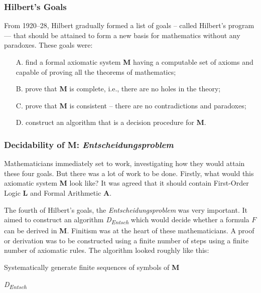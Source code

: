 \documentclass[a4paper, 12pt]{article}
\theoremstyle{definition}
\begin{document}
    \subsubsection*{Hilbert's Goals}
    \vspace{-0.75 em}
    From 1920--28, Hilbert gradually formed a list of goals -- called Hilbert's program --- that should be attained to form a new basis 
    for mathematics without any paradoxes. These goals were:
    \vspace{-0.75 em}
    \begin{enumerate}
        \item[A.] find a formal axiomatic system \textbf{M} having a computable set of axioms and capable of proving all the theorems of mathematics;
        \vspace{-0.3 em} 
        \item[B.] prove that \textbf{M} is complete, i.e., there are no holes in the theory;
        \vspace{-0.3 em} 
        \item[C.] prove that \textbf{M} is consistent -- there are no contradictions and paradoxes;
        \vspace{-0.3 em} 
        \item[D.] construct an algorithm that is a decision procedure for \textbf{M}.     
    \end{enumerate}

    \subsubsection*{Decidability of \textbf{M}: \textit{Entscheidungsproblem}}
    \vspace{-0.75 em} 
    Mathematicians immediately set to work, investigating how they would attain these four goals. But there was a lot of work to be done. Firstly, what 
    would this axiomatic system \textbf{M} look like? It was agreed that it should contain First-Order Logic \textbf{L} and 
    Formal Arithmetic \textbf{A}. \cite{robic_foundations_2020}

    The fourth of Hilbert's goals, the \textit{Entscheidungsproblem} was very important. It aimed to construct an algorithm 
    \textit{D\textsubscript{Entsch}} which would decide whether a formula $F$ can be derived in \textbf{M}. 
    Finitism was at the heart of these mathematicians. A proof or derivation was to be constructed using a finite 
    number of steps using a finite number of axiomatic rules. The algorithm looked roughly like this:
    \begin{algorithm}
        Systematically generate finite sequences of symbols of \textbf{M} \\
        \caption{\textit{D\textsubscript{Entsch}}}
    \end{algorithm}
\end{document}
